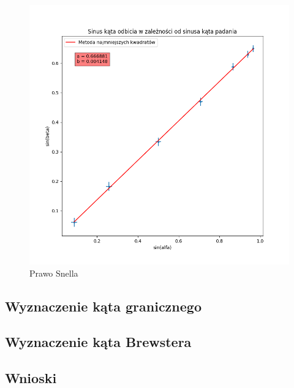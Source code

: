 \documentclass[a4paper]{article}
\begin{document}
\begin{figure}[h]
\centering
\includegraphics[scale=0.7]{snell.png}
\caption{Prawo Snella}
\label{snell-wykres}
\end{figure}


\subsection{Wyznaczenie kąta granicznego}
\subsection{Wyznaczenie kąta Brewstera}


\subsection{Wnioski}
\end{document}
